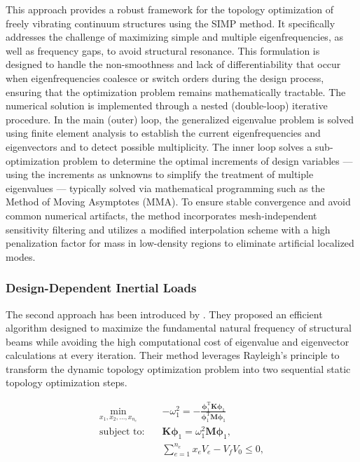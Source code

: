 \documentclass[applsci,article,submit,pdftex,moreauthors]{Definitions/mdpi}
\begin{document}
This approach provides a robust framework for the topology optimization of freely vibrating continuum structures using the SIMP method. It specifically addresses the challenge of maximizing simple and multiple eigenfrequencies, as well as frequency gaps, to avoid structural resonance. This formulation is designed to handle the non-smoothness and lack of differentiability that occur when eigenfrequencies coalesce or switch orders during the design process, ensuring that the optimization problem remains mathematically tractable. The numerical solution is implemented through a nested (double-loop) iterative procedure. In the main (outer) loop, the generalized eigenvalue problem is solved using finite element analysis to establish the current eigenfrequencies and eigenvectors and to detect possible multiplicity. The inner loop solves a sub-optimization problem to determine the optimal increments of design variables — using the increments as unknowns to simplify the treatment of multiple eigenvalues — typically solved via mathematical programming such as the Method of Moving Asymptotes (MMA). To ensure stable convergence and avoid common numerical artifacts, the method incorporates mesh-independent sensitivity filtering and utilizes a modified interpolation scheme with a high penalization factor for mass in low-density regions to eliminate artificial localized modes.

\subsubsection{Design-Dependent Inertial Loads}

The second approach has been introduced by \citet{YUKSEL2025}. They proposed an efficient algorithm designed to maximize the fundamental natural frequency of structural beams while avoiding the high computational cost of eigenvalue and eigenvector calculations at every iteration. Their method leverages Rayleigh’s principle to transform the dynamic topology optimization problem into two sequential static topology optimization steps.

\begin{align*}
\min_{x_1,x_2,\dots,x_{n_e}} \quad & -\omega_1^2 = -\frac{\boldsymbol{\phi}_1^{\mathrm{T}} \mathbf{K} \boldsymbol{\phi}_1}{\boldsymbol{\phi}_1^{\mathrm{T}} \mathbf{M} \boldsymbol{\phi}_1} \\[8pt]
\text{subject to:} \quad & \mathbf{K}\boldsymbol{\phi}_1 = \omega_1^2 \mathbf{M}\boldsymbol{\phi}_1, \\[4pt]
& \sum_{e=1}^{n_e} x_e V_e - V_f V_0 \le 0,
\end{align*}
\end{document}
